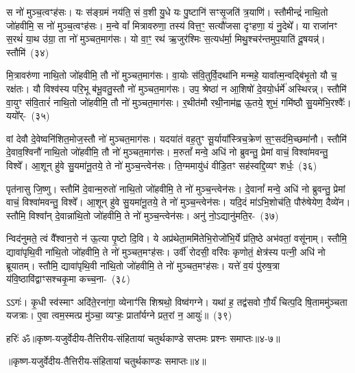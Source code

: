 स नो॑ मुञ्च॒त्वꣳह॑सः। यः स॑ङ्ग्रमं नय॑ति॒ सं व॒शी यु॒धे यः पु॒ष्टानि॑ सꣳसृ॒जति॑ त्र॒याणि॑। स्तौमीन्द्रं॑ नाथि॒तो जो॑हवीमि॒ स नो॑ मुञ्च॒त्वꣳह॑सः। म॒न्वे वां᳚ मित्रावरुणा॒ तस्य॑ वित्त॒ꣳ॒ सत्यौ॑जसा दृꣳहणा॒ यं नु॒देथे᳚। या राजा॑नꣳ स॒रथं॑ या॒थ उ॑ग्रा॒ ता नो॑ मुञ्चत॒माग॑सः। यो वा॒ꣳ॒ रथ॑ ऋ॒जुर॑श्मिः स॒त्यध॑र्मा॒ मिथु॒श्चर॑न्तमुप॒याति॑ दू॒षयन्न्॑। स्तौमि॑~(३४)\ip

मि॒त्रावरु॑णा नाथि॒तो जो॑हवीमि॒ तौ नो॑ मुञ्चत॒माग॑सः। वा॒योः स॑वि॒तुर्वि॒दथा॑नि मन्महे॒ यावा᳚त्म॒न्वद्बि॑भृ॒तो यौ च॒ रक्ष॑तः। यौ विश्व॑स्य परि॒भू ब॑भू॒वतु॒स्तौ नो॑ मुञ्चत॒माग॑सः। उप॒ श्रेष्ठा॑ न आ॒शिषो॑ दे॒वयो॒र्धर्मे॑ अस्थिरन्न्। स्तौमि॑ वा॒युꣳ स॑वि॒तारं॑ नाथि॒तो जो॑हवीमि॒ तौ नो॑ मुञ्चत॒माग॑सः। र॒थीत॑मौ रथी॒नाम॑ह्व ऊ॒तये॒ शुभं॒ गमि॑ष्ठौ सु॒यमे॑भि॒रश्वैः᳚। ययो᳚र्-~(३५)\ip

वां देवौ दे॒वेष्वनि॑शित॒मोज॒स्तौ नो॑ मुञ्चत॒माग॑सः। यदया॑तं वह॒तुꣳ सू॒र्याया᳚स्त्रिच॒क्रेण॑ स॒ꣳ॒सद॑मि॒च्छमा॑नौ। स्तौमि॑ दे॒वाव॒श्विनौ॑ नाथि॒तो जो॑हवीमि॒ तौ नो॑ मुञ्चत॒माग॑सः। म॒रुतां᳚ मन्वे॒ अधि॑ नो ब्रुवन्तु॒ प्रेमां वाचं॒ विश्वा॑मवन्तु॒ विश्वे᳚। आ॒शून् हु॑वे सु॒यमा॑नू॒तये॒ ते नो॑ मुञ्च॒न्त्वेन॑सः। ति॒ग्ममायु॑धं वीडि॒तꣳ सह॑स्वद्दि॒व्यꣳ शर्धः॒~(३६)\ip

पृत॑नासु जि॒ष्णु। स्तौमि॑ दे॒वान्म॒रुतो॑ नाथि॒तो जो॑हवीमि॒ ते नो॑ मुञ्च॒न्त्वेन॑सः। दे॒वानां᳚ मन्वे॒ अधि॑ नो ब्रुवन्तु॒ प्रेमां वाचं॒ विश्वा॑मवन्तु॒ विश्वे᳚। आ॒शून् हु॑वे सु॒यमा॑नू॒तये॒ ते नो॑ मुञ्च॒न्त्वेन॑सः। यदि॒दं मा॑\-ऽ\-भि॒शोच॑ति॒ पौरु॑षेयेण॒ दैव्ये॑न। स्तौमि॒ विश्वा᳚न् दे॒वान्ना॑थि॒तो जो॑हवीमि॒ ते नो॑ मुञ्च॒न्त्वेन॑सः। अनु॑ नो॒\-ऽद्यानु॑मति॒र-~(३७)\ip

न्विद॑नुमते॒ त्वं वै᳚श्वान॒रो न॑ ऊ॒त्या पृ॒ष्टो दि॒वि। ये अप्र॑थेता॒ममि॑तेभि॒रोजो॑भि॒र्ये प्र॑ति॒ष्ठे अभ॑वतां॒ वसू॑नाम्। स्तौमि॒ द्यावा॑\-पृथि॒वी ना॑थि॒तो जो॑हवीमि॒ ते नो॑ मुञ्चत॒मꣳह॑सः। उर्वी॑ रोदसी॒ वरि॑वः कृणोतं॒ क्षेत्र॑स्य पत्नी॒ अधि॑ नो ब्रूयातम्। स्तौमि॒ द्यावा॑\-पृथि॒वी ना॑थि॒तो जो॑हवीमि॒ ते नो॑ मुञ्चत॒मꣳह॑सः। यत्ते॑ व॒यं पु॑रुष॒त्रा य॑वि॒ष्ठावि॑द्वाꣳसश्चकृ॒मा कच्च॒ना-~(३८)\ip

ऽऽगः॑। कृ॒धी स्व॑स्माꣳ अदि॑ते॒रना॑गा॒ व्येनाꣳ॑सि शिश्रथो॒ विष्व॑गग्ने। यथा॑ ह॒ तद्व॑सवो गौ॒र्यं॑ चित्प॒दि षि॒ताममु॑ञ्चता यजत्राः। ए॒वा त्वम॒स्मत्प्र मु॑ञ्चा॒ व्यꣳहः॒ प्राता᳚र्यग्ने प्रत॒रां न॒ आयुः॑॥~(३९)\ip


{\anuvakamend[{गन्ता॑ दू॒षय॒न्थ्स्तौमि॒ ययोः॒ शर्धो\-ऽनु॑मति॒रनु॑ च॒न चतु॑स्त्रिꣳशच्च}]}%

{हरिः॑ ॐ}{॥कृष्ण-यजुर्वेदीय-तैत्तिरीय-संहितायां चतुर्थकाण्डे सप्तमः प्रश्नः समाप्तः॥४-७॥}

\centerline{॥कृष्ण-यजुर्वेदीय-तैत्तिरीय-संहितायां चतुर्थकाण्डः समाप्तः॥४॥}

\medskip

\centerline{\hyperref[sec:startkanda4]{\closesection}}



\kandaend


